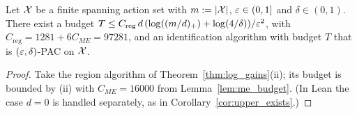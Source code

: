 \begin{corollary}\label{cor:log_gains_exists}
\leanok
{}
Let $\mathcal{X}$ be a finite spanning action set with $m := \lvert \mathcal{X} \rvert$, $\varepsilon \in (0,1]$ and
$\delta \in (0,1)$. There exist a budget
$T \le C_{\mathrm{reg}}\, d\,(\log((m/d)_+) + \log(4/\delta))/\varepsilon^2$, with
$C_{\mathrm{reg}} = 1281 + 6C_{ME} = 97281$, and an identification algorithm with budget $T$ that is
$(\varepsilon,\delta)$-PAC on $\mathcal{X}$.
\end{corollary}
\begin{proof}
\leanok
{}
Take the region algorithm of Theorem~\ref{thm:log_gains}(ii); its budget is bounded by (ii)
with $C_{ME} = 16000$ from Lemma~\ref{lem:me_budget}. (In Lean the case $d = 0$ is handled
separately, as in Corollary~\ref{cor:upper_exists}.)
\end{proof}

